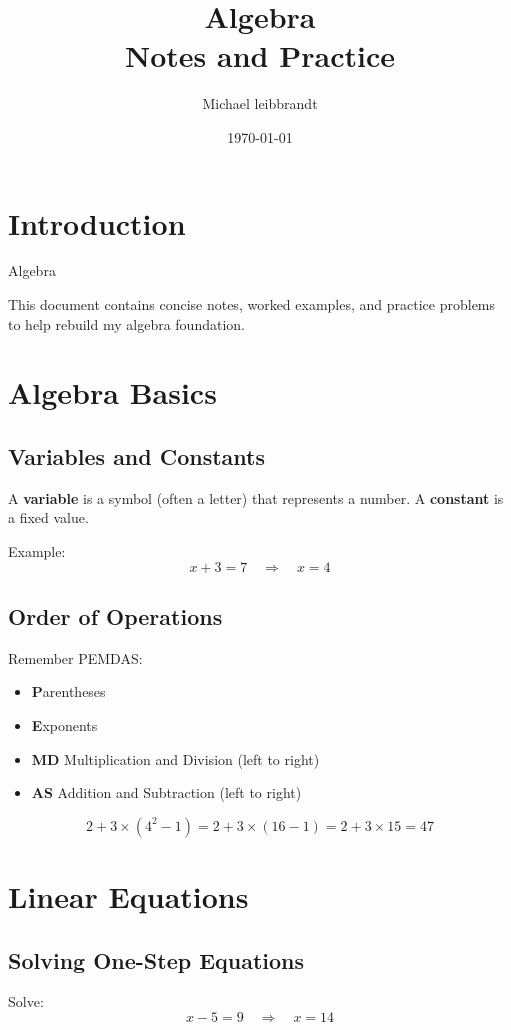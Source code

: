 \documentclass[11pt]{article}
\title{\Huge \textbf{Algebra}\\\large Notes and Practice}
\author{Michael leibbrandt}
\date{\today}
\begin{document}
\maketitle
\tableofcontents
\newpage

\section{Introduction}

Algebra

This document contains concise notes, worked examples, and practice problems to help rebuild my algebra foundation.

\section{Algebra Basics}

\subsection{Variables and Constants}

A \textbf{variable} is a symbol (often a letter) that represents a number. A \textbf{constant} is a fixed value.

Example:
\[
x + 3 = 7 \quad \Rightarrow \quad x = 4
\]

\subsection{Order of Operations}

Remember PEMDAS:
\begin{itemize}
  \item \textbf{P}arentheses
  \item \textbf{E}xponents
  \item \textbf{MD} Multiplication and Division (left to right)
  \item \textbf{AS} Addition and Subtraction (left to right)
\end{itemize}

\[
2 + 3 \times (4^2 - 1) = 2 + 3 \times (16 - 1) = 2 + 3 \times 15 = 47
\]

\section{Linear Equations}

\subsection{Solving One-Step Equations}

Solve:
\[
x - 5 = 9 \quad \Rightarrow \quad x = 14
\]

\end{document}
